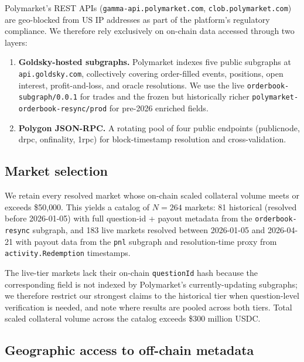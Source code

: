 \documentclass[11pt]{article}
\begin{document}
Polymarket's REST APIs (\texttt{gamma-api.polymarket.com},
\texttt{clob.polymarket.com}) are geo-blocked from US IP addresses as
part of the platform's regulatory compliance. We therefore rely
exclusively on on-chain data accessed through two layers:

\begin{enumerate}
  \item \textbf{Goldsky-hosted subgraphs.} Polymarket indexes five
    public subgraphs at \texttt{api.goldsky.com}, collectively covering
    order-filled events, positions, open interest, profit-and-loss, and
    oracle resolutions. We use the live
    \texttt{orderbook-subgraph/0.0.1} for trades and the frozen but
    historically richer \texttt{polymarket-orderbook-resync/prod} for
    pre-2026 enriched fields.
  \item \textbf{Polygon JSON-RPC.} A rotating pool of four public
    endpoints (publicnode, drpc, onfinality, 1rpc) for block-timestamp
    resolution and cross-validation.
\end{enumerate}

\subsection{Market selection}

We retain every resolved market whose on-chain scaled collateral volume
meets or exceeds \$50{,}000. This yields a catalog of $N = 264$ markets:
81 historical (resolved before 2026-01-05) with full question-id +
payout metadata from the \texttt{orderbook-resync} subgraph, and 183
live markets resolved between 2026-01-05 and 2026-04-21 with payout
data from the \texttt{pnl} subgraph and resolution-time proxy from
\texttt{activity.Redemption} timestamps.

The live-tier markets lack their on-chain \texttt{questionId} hash
because the corresponding field is not indexed by Polymarket's
currently-updating subgraphs; we therefore restrict our strongest
claims to the historical tier when question-level verification is
needed, and note where results are pooled across both tiers. Total
scaled collateral volume across the catalog exceeds \$300 million USDC.

\subsection{Geographic access to off-chain metadata}
\end{document}
